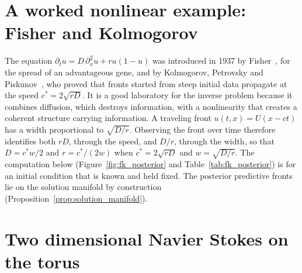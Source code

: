 \section{A worked nonlinear example: Fisher and Kolmogorov}

The equation $\partial_tu = D\,\partial_x^2u+ru(1-u)$ was introduced in 1937 by Fisher~\cite{fisher1937}, for the spread of an advantageous gene, and by Kolmogorov, Petrovsky and Piskunov~\cite{kolmogorov1937}, who proved that fronts started from steep initial data propagate at the speed $c^* = 2\sqrt{rD}$. It is a good laboratory for the inverse problem because it combines diffusion, which destroys information, with a nonlinearity that creates a coherent structure carrying information. A traveling front $u(t,x) = U(x-ct)$ has a width proportional to $\sqrt{D/r}$. Observing the front over time therefore identifies both $rD$, through the speed, and $D/r$, through the width, so that $D=c^*w/2$ and $r=c^*/(2w)$ when $c^*=2\sqrt{rD}$ and $w=\sqrt{D/r}$. The computation below (Figure~\ref{fig:fk_posterior} and Table~\ref{tab:fk_posterior}) is for an initial condition that is known and held fixed. The posterior predictive fronts lie on the solution manifold by construction (Proposition~\ref{prop:solution_manifold}).



\section{Two dimensional Navier Stokes on the torus}

